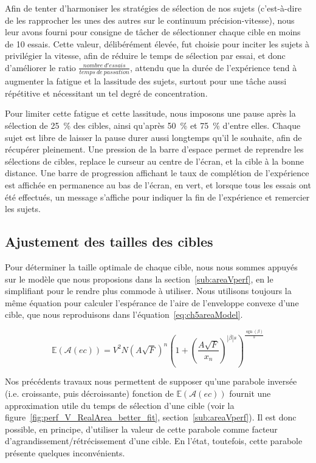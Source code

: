 	Afin de tenter d'harmoniser les stratégies de sélection de nos sujets (c'est-à-dire de les rapprocher les unes des autres sur le continuum précision-vitesse), nous leur avons fourni pour consigne de tâcher de sélectionner chaque cible en moins de 10 essais. Cette valeur, délibérément élevée, fut choisie pour inciter les sujets à privilégier la vitesse, afin de réduire le temps de sélection par essai, et donc d'améliorer le ratio $\frac{nombre~d'essais}{temps~de~passation}$, attendu que la durée de l'expérience tend à augmenter la fatigue et la lassitude des sujets, surtout pour une tâche aussi répétitive et nécessitant un tel degré de concentration.
	
	Pour limiter cette fatigue et cette lassitude, nous imposons une pause après la sélection de 25~\%{} des cibles, ainsi qu'après 50~\%{} et 75~\%{} d'entre elles. Chaque sujet est libre de laisser la pause durer aussi longtemps qu'il le souhaite, afin de récupérer pleinement. Une pression de la barre d'espace permet de reprendre les sélections de cibles, replace le curseur au centre de l'écran, et la cible à la bonne distance. Une barre de progression affichant le taux de complétion de l'expérience est affichée en permanence au bas de l'écran, en vert, et lorsque tous les essais ont été effectués, un message s'affiche pour indiquer la fin de l'expérience et remercier les sujets.
	
	\subsection{Ajustement des tailles des cibles}
	Pour déterminer la taille optimale de chaque cible, nous nous sommes appuyés sur le modèle que nous proposions dans la section~\ref{sub:areaVperf}, en le simplifiant pour le rendre plus commode à utiliser. Nous utilisons toujours la même équation pour calculer l'espérance de l'aire de l'enveloppe convexe d'une cible, que nous reproduisons dans l'équation~\ref{eq:ch5areaModel}.
	
	\begin{equation}
		\mathbb{E}(\mathcal{A}(ec)) = V^{2}N \left( A\sqrt{F} \right)^n \left(1+\left(\frac{A\sqrt{F}}{x_n}\right)^{|\beta|s}\right)^{\frac{\operatorname{sgn}(\beta)}{s}}
		\label{eq:ch5areaModel}
	\end{equation}
	
	Nos précédents travaux nous permettent de supposer qu'une parabole \og inversée \fg{} (i.e. croissante, puis décroissante) fonction de $\mathbb{E}(\mathcal{A}(ec))$ fournit une approximation utile du temps de sélection d'une cible (voir la figure~\ref{fig:perf_V_RealArea_better_fit}, section~\ref{sub:areaVperf}). Il est donc possible, en principe, d'utiliser la valeur de cette parabole comme facteur d'agrandissement/rétrécissement d'une cible. En l'état, toutefois, cette parabole présente quelques inconvénients.
	

